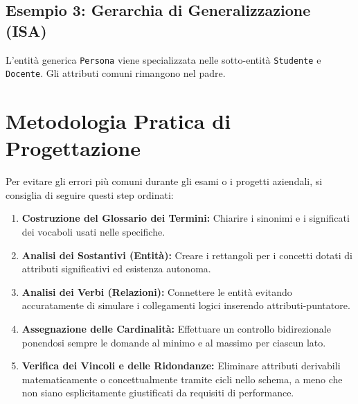 \subsection{Esempio 3: Gerarchia di Generalizzazione (ISA)}
L'entità generica \texttt{Persona} viene specializzata nelle sotto-entità \texttt{Studente} e \texttt{Docente}. Gli attributi comuni rimangono nel padre.

\begin{center}
\end{center}

\section{Metodologia Pratica di Progettazione}
Per evitare gli errori più comuni durante gli esami o i progetti aziendali, si consiglia di seguire questi step ordinati:
\begin{enumerate}
    \item \textbf{Costruzione del Glossario dei Termini:} Chiarire i sinonimi e i significati dei vocaboli usati nelle specifiche.
    \item \textbf{Analisi dei Sostantivi (Entità):} Creare i rettangoli per i concetti dotati di attributi significativi ed esistenza autonoma.
    \item \textbf{Analisi dei Verbi (Relazioni):} Connettere le entità evitando accuratamente di simulare i collegamenti logici inserendo attributi-puntatore.
    \item \textbf{Assegnazione delle Cardinalità:} Effettuare un controllo bidirezionale ponendosi sempre le domande al minimo e al massimo per ciascun lato.
    \item \textbf{Verifica dei Vincoli e delle Ridondanze:} Eliminare attributi derivabili matematicamente o concettualmente tramite cicli nello schema, a meno che non siano esplicitamente giustificati da requisiti di performance.
\end{enumerate}
